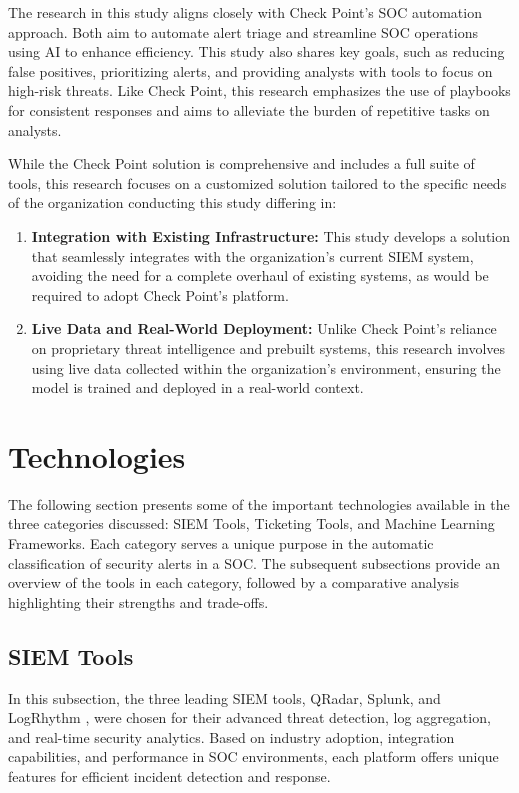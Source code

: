 The research in this study aligns closely with Check Point’s SOC automation approach. 
Both aim to automate alert triage and streamline SOC operations using AI to enhance efficiency. 
This study also shares key goals, such as reducing false positives, prioritizing alerts, and providing analysts with tools to focus on high-risk threats. 
Like Check Point, this research emphasizes the use of playbooks for consistent responses and aims to alleviate the burden of repetitive tasks on analysts.

While the Check Point solution is comprehensive and includes a full suite of tools, this research focuses on a customized solution tailored to the specific needs of the organization conducting this study differing in:
\begin{enumerate}
    \item \textbf{Integration with Existing Infrastructure:} This study develops a solution that seamlessly integrates with the organization's current SIEM system, avoiding the need for a complete overhaul of existing systems, as would be required to adopt Check Point’s platform.
    \item \textbf{Live Data and Real-World Deployment:} Unlike Check Point’s reliance on proprietary threat intelligence and prebuilt systems, this research involves using live data collected within the organization's environment, ensuring the model is trained and deployed in a real-world context.
\end{enumerate}

\section{Technologies}

The following section presents some of the important technologies available in the three categories discussed: SIEM Tools, Ticketing Tools, and Machine Learning Frameworks. 
Each category serves a unique purpose in the automatic classification of security alerts in a SOC.
The subsequent subsections provide an overview of the tools in each category, followed by a comparative analysis highlighting their strengths and trade-offs.

\subsection{SIEM Tools}

In this subsection, the three leading SIEM tools, QRadar, Splunk, and LogRhythm \parencite{exabeam2024}, were chosen for their advanced threat detection, log aggregation, and real-time security analytics. 
Based on industry adoption, integration capabilities, and performance in SOC environments, each platform offers unique features for efficient incident detection and response.

